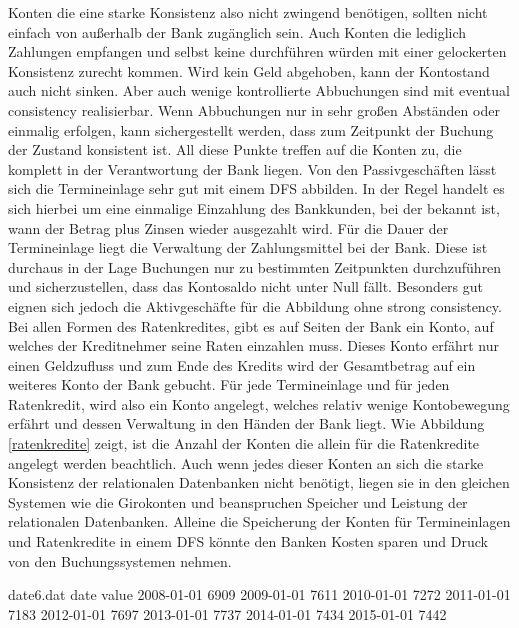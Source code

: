 \documentclass[12pt,oneside,a4paper,parskip]{scrbook}
\begin{document}
Konten die eine starke Konsistenz also nicht zwingend benötigen, sollten nicht einfach von außerhalb der Bank zugänglich sein. Auch Konten die lediglich Zahlungen empfangen und selbst keine durchführen würden mit einer gelockerten Konsistenz zurecht kommen. Wird kein Geld abgehoben, kann der Kontostand auch nicht sinken. Aber auch wenige kontrollierte Abbuchungen sind mit eventual consistency realisierbar. Wenn Abbuchungen nur in sehr großen Abständen oder einmalig erfolgen, kann sichergestellt werden, dass zum Zeitpunkt der Buchung der Zustand konsistent ist. All diese Punkte treffen auf die Konten zu, die komplett in der Verantwortung der Bank liegen. Von den Passivgeschäften lässt sich die Termineinlage sehr gut mit einem DFS abbilden. In der Regel handelt es sich hierbei um eine einmalige Einzahlung des Bankkunden, bei der bekannt ist, wann der Betrag plus Zinsen wieder ausgezahlt wird. Für die Dauer der Termineinlage liegt die Verwaltung der Zahlungsmittel bei der Bank. Diese ist durchaus in der Lage Buchungen nur zu bestimmten Zeitpunkten durchzuführen und sicherzustellen, dass das Kontosaldo nicht unter Null fällt. Besonders gut eignen sich jedoch die Aktivgeschäfte für die Abbildung ohne strong consistency. Bei allen Formen des Ratenkredites, gibt es auf Seiten der Bank ein Konto, auf welches der Kreditnehmer seine Raten einzahlen muss. Dieses Konto erfährt nur einen Geldzufluss und zum Ende des Kredits wird der Gesamtbetrag auf ein weiteres Konto der Bank gebucht. Für jede Termineinlage und für jeden Ratenkredit, wird also ein Konto angelegt, welches relativ wenige Kontobewegung erfährt und dessen Verwaltung in den Händen der Bank liegt. Wie Abbildung \ref{ratenkredite} zeigt, ist die Anzahl der Konten die allein für die Ratenkredite angelegt werden beachtlich. Auch wenn jedes dieser Konten an sich die starke Konsistenz der relationalen Datenbanken nicht benötigt, liegen sie in den gleichen Systemen wie die Girokonten und beanspruchen Speicher und Leistung der relationalen Datenbanken. Alleine die Speicherung der Konten für Termineinlagen und Ratenkredite in einem DFS könnte den Banken Kosten sparen und Druck von den Buchungssystemen nehmen.

\begin{filecontents}{date6.dat}
date       value
2008-01-01  6909
2009-01-01  7611
2010-01-01  7272
2011-01-01  7183
2012-01-01  7697
2013-01-01  7737
2014-01-01  7434
2015-01-01  7442
\end{filecontents}
\end{document}
